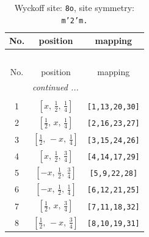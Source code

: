 \documentclass[fleqn,8pt]{jsarticle}
\begin{document}
\begin{longtable}{ccc}
\caption{Wyckoff site: {\tt 8o}, site symmetry: {\tt m'2'm.}}
 \\
 \hline \hline
No. & position & mapping \\ \hline \endfirsthead

\multicolumn{2}{l}{\tablename\ \thetable{}} \\
 \hline \hline
No. & position & mapping \\ \hline \endhead

 \hline \hline
\multicolumn{2}{r}{\footnotesize\it continued ...} \\ \endfoot

 \hline \hline
\multicolumn{2}{r}{} \\ \endlastfoot

1 & $\left[ x,\, \frac{1}{2},\, \frac{1}{4} \right]$ & {\tt [1,13,20,30]} \\ \hline
2 & $\left[ \frac{1}{2},\, x,\, \frac{1}{4} \right]$ & {\tt [2,16,23,27]} \\ \hline
3 & $\left[ \frac{1}{2},\, - x,\, \frac{1}{4} \right]$ & {\tt [3,15,24,26]} \\ \hline
4 & $\left[ x,\, \frac{1}{2},\, \frac{3}{4} \right]$ & {\tt [4,14,17,29]} \\ \hline
5 & $\left[ - x,\, \frac{1}{2},\, \frac{3}{4} \right]$ & {\tt [5,9,22,28]} \\ \hline
6 & $\left[ - x,\, \frac{1}{2},\, \frac{1}{4} \right]$ & {\tt [6,12,21,25]} \\ \hline
7 & $\left[ \frac{1}{2},\, x,\, \frac{3}{4} \right]$ & {\tt [7,11,18,32]} \\ \hline
8 & $\left[ \frac{1}{2},\, - x,\, \frac{3}{4} \right]$ & {\tt [8,10,19,31]} \\
\end{longtable}
\renewcommand{\arraystretch}{1.2}
\end{document}
